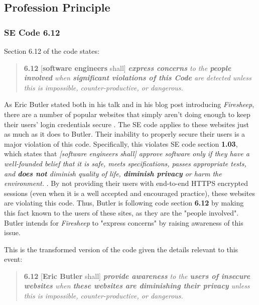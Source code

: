 \documentclass[11pt]{article}
\begin{document}
\begin{multicols}{2}
\subsection{Profession Principle}
\subsubsection{SE Code 6.12}
Section 6.12 of the code states:
\begin{quote}
  \textbf{6.12} [\textbf{software engineers} shall] \emph{\textbf{express concerns} to the \textbf{people involved} when \textbf{significant violations of this Code} are detected unless this is impossible, counter-productive, or dangerous.} \cite{se_code}
\end{quote}

As Eric Butler stated both in his talk and in his blog post introducing \emph{Firesheep}, there are a number of popular websites that simply aren't doing enough to keep their users' login credentials secure \cite{toorcon_slides} \cite{codebutler_main}. The SE code applies to these websites just as much as it does to Butler. Their inability to properly secure their users is a major violation of this code. Specifically, this violates SE code section \textbf{1.03}, which states that \emph{[software engineers shall] approve software only if they have a well-founded belief that it is safe, meets specifications, passes appropriate tests, and \textbf{does not} diminish quality of life, \textbf{diminish privacy} or harm the environment.} \cite{se_code}. By not providing their users with end-to-end HTTPS encrypted sessions (even when it is a well accepted and encouraged practice), these websites are violating this code. Thus, Butler is following code section \textbf{6.12} by making this fact known to the users of these sites, as they are the "people involved". Butler intends for \emph{Firesheep} to "express concerns" by raising awareness of this issue.

This is the transformed version of the code given the details relevant to this event:

\begin{quote}
  \textbf{6.12} [\textbf{Eric Butler} shall] \emph{\textbf{provide awareness} to the \textbf{users of insecure websites} when \textbf{these websites are diminishing their privacy} unless this is impossible, counter-productive, or dangerous.}
\end{quote}


\end{multicols}
\end{document}
